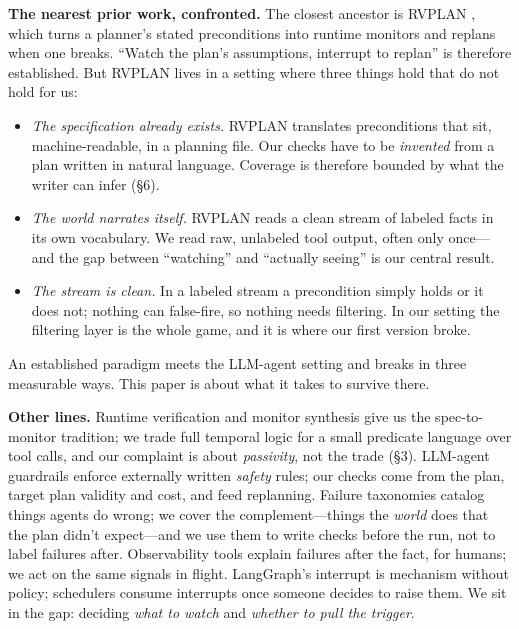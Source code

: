 \documentclass[acmsmall,screen]{acmart}
\begin{document}
\textbf{The nearest prior work, confronted.} The closest ancestor is RVPLAN
\cite{ref6, ref34}, which turns a planner's stated preconditions into runtime
monitors and replans when one breaks. ``Watch the plan's assumptions, interrupt
to replan'' is therefore established. But RVPLAN lives in a setting where three
things hold that do not hold for us:

\begin{itemize}
  \item \emph{The specification already exists.} RVPLAN translates
  preconditions that sit, machine-readable, in a planning file. Our checks have
  to be \emph{invented} from a plan written in natural language. Coverage is
  therefore bounded by what the writer can infer (\S6).
  \item \emph{The world narrates itself.} RVPLAN reads a clean stream of
  labeled facts in its own vocabulary. We read raw, unlabeled tool output,
  often only once---and the gap between ``watching'' and ``actually seeing'' is
  our central result.
  \item \emph{The stream is clean.} In a labeled stream a precondition simply
  holds or it does not; nothing can false-fire, so nothing needs filtering. In
  our setting the filtering layer is the whole game, and it is where our first
  version broke.
\end{itemize}

An established paradigm meets the LLM-agent setting and breaks in three
measurable ways. This paper is about what it takes to survive there.

\textbf{Other lines.} Runtime verification and monitor synthesis \cite{ref4,
ref5} give us the spec-to-monitor tradition; we trade full temporal logic for a
small predicate language over tool calls, and our complaint is about
\emph{passivity}, not the trade (\S3). LLM-agent guardrails \cite{ref9, ref10,
ref11, ref12, ref13} enforce externally written \emph{safety} rules; our checks
come from the plan, target plan validity and cost, and feed replanning. Failure
taxonomies \cite{ref14, ref20} catalog things agents do wrong; we cover the
complement---things the \emph{world} does that the plan didn't expect---and we
use them to write checks before the run, not to label failures after.
Observability tools \cite{ref15, ref16, ref17, ref18} explain failures after
the fact, for humans; we act on the same signals in flight. LangGraph's
interrupt \cite{ref22} is mechanism without policy; schedulers \cite{ref19}
consume interrupts once someone decides to raise them. We sit in the gap:
deciding \emph{what to watch} and \emph{whether to pull the trigger}.
\end{document}

